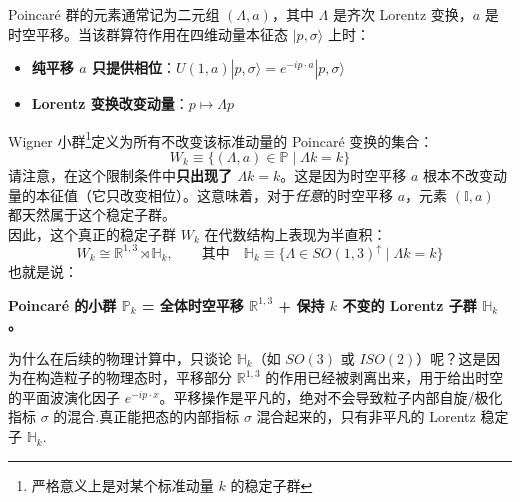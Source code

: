 Poincaré 群的元素通常记为二元组 $(\Lambda, a)$，其中 $\Lambda$ 是齐次 Lorentz 变换，$a$ 是时空平移。当该群算符作用在四维动量本征态 $|p, \sigma\rangle$ 上时：
\begin{itemize}
    \item \textbf{纯平移 $a$ 只提供相位}：$U(1, a)|p, \sigma\rangle = e^{-ip \cdot a}|p, \sigma\rangle$
    \item \textbf{Lorentz 变换改变动量}：$p \mapsto \Lambda p$
\end{itemize}
\vspace{2ex}
Wigner 小群\footnote{严格意义上是对某个标准动量 $k$ 的稳定子群}定义为所有不改变该标准动量的 Poincaré 变换的集合：
\begin{equation}
    \boxed{W_k \equiv \{(\Lambda, a) \in \mathbb{P} \mid \Lambda k = k\}}
\end{equation}
请注意，在这个限制条件中\textbf{只出现了 $\Lambda k = k$}。这是因为时空平移 $a$ 根本不改变动量的本征值（它只改变相位）。这意味着，对于\emph{任意}的时空平移 $a$，元素 $(\mathbb{I}, a)$ 都天然属于这个稳定子群。
\vspace{2ex}
\\
因此，这个真正的稳定子群 $W_k$ 在代数结构上表现为半直积：
\begin{equation}
    \boxed{W_k \cong \mathbb{R}^{1,3} \rtimes \mathbb{H}_k, \qquad \text{其中} \quad \mathbb{H}_k \equiv \{\Lambda \in SO(1,3)^\uparrow \mid \Lambda k = k\}}
\end{equation}
也就是说：
\begin{tcolorbox}[colback=white!5,colframe=black!45]
    \begin{center}
    \textbf{Poincaré 的小群 $\mathbb{P}_k$ = 全体时空平移 $\mathbb{R}^{1,3}$ + 保持 $k$ 不变的 Lorentz 子群 $\mathbb{H}_k$。}
\end{center}
\end{tcolorbox}
\vspace{2ex}
为什么在后续的物理计算中，只谈论 $\mathbb{H}_k$（如 $SO(3)$ 或 $ISO(2)$）呢？这是因为在构造粒子的物理态时，平移部分 $\mathbb{R}^{1,3}$ 的作用已经被剥离出来，用于给出时空的平面波演化因子 $e^{-ip\cdot x}$。平移操作是平凡的，绝对不会导致粒子内部自旋/极化指标 $\sigma$ 的混合.真正能把态的内部指标 $\sigma$ 混合起来的，只有非平凡的 Lorentz 稳定子 $\mathbb{H}_k$.


